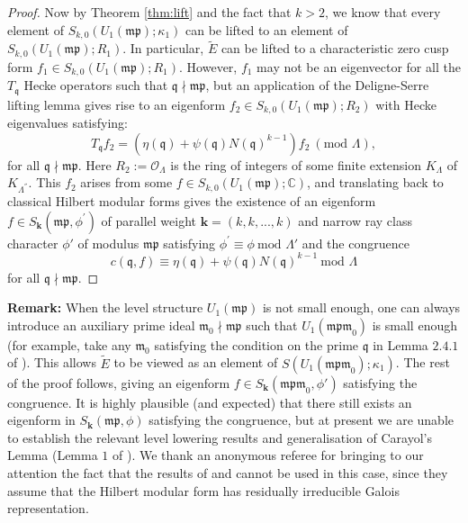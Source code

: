 \documentclass[a4paper,oneside]{amsart}
\theoremstyle{plain}
\theoremstyle{definition}
\begin{document}
\begin{proof}
Now by Theorem \ref{thm:lift} and the fact that $k>2$, we know that every element of $S_{k,0}(U_1(\mathfrak{mp});\kappa_1)$ can be lifted to an element of $S_{k,0}(U_1(\mathfrak{mp});R_1)$. In particular, $\tilde{E}$ can be lifted to a characteristic zero cusp form $f_1 \in S_{k,0}(U_1(\mathfrak{mp});R_1)$. However, $f_1$ may not be an eigenvector for all the $T_\mathfrak{q}$ Hecke operators such that $\mathfrak{q} \nmid \mathfrak{mp}$, but an application of the Deligne-Serre lifting lemma \cite[Lemma 6.11]{deligneserre} gives rise to an eigenform $f_2 \in S_{k,0}(U_1(\mathfrak{mp});R_2)$ with Hecke eigenvalues satisfying:
\begin{equation*}
    T_{\mathfrak{q}}f_2 = (\eta(\mathfrak{q}) + \psi(\mathfrak{q})N(\mathfrak{q})^{k-1})f_2 \ (\text{mod } \Lambda),
\end{equation*}
for all $\mathfrak{q} \nmid \mathfrak{mp}$. Here $R_2:= \mathcal{O}_{\Lambda}$ is the ring of integers of some finite extension $K_{\Lambda}$ of $K_{\Lambda^{''}}$. This $f_2$ arises from some $f \in S_{k,0}(U_1(\mathfrak{mp});\mathbb{C})$, and translating back to classical Hilbert modular forms gives the existence of an eigenform $f \in S_{\textbf{k}}(\mathfrak{mp}, \phi^\prime)$ of parallel weight $\textbf{k} = (k,k,...,k)$ and narrow ray class character $\phi'$ of modulus $\mathfrak{mp}$ satisfying $\phi^\prime \equiv \phi \ \text{mod } \Lambda'$ and the congruence
\begin{equation*}
    c(\mathfrak{q}, f) \equiv \eta(\mathfrak{q}) + \psi(\mathfrak{q})N(\mathfrak{q})^{k-1} \ \text{mod } \Lambda
\end{equation*}
for all $\mathfrak{q} \nmid \mathfrak{mp}$. 
\end{proof}

\noindent \textbf{Remark:} When the level structure $U_1(\mathfrak{mp})$ is not small enough, one can always introduce an auxiliary prime ideal $\mathfrak{m}_0\nmid \mathfrak{mp}$ such that $U_1(\mathfrak{mpm}_0)$ is small enough (for example, take any $\mathfrak{m}_0$ satisfying the condition on the prime $\mathfrak{q}$ in Lemma $2.4.1$ of \cite{diamondsasaki}). This allows $\tilde{E}$ to be viewed as an element of $S(U_1(\mathfrak{mpm}_0);\kappa_1)$. The rest of the proof follows, giving an eigenform $f\in S_{\textbf{k}}(\mathfrak{mpm}_0,\phi')$ satisfying the congruence. It is highly plausible (and expected) that there still exists an eigenform in $S_{\textbf{k}}(\mathfrak{mp},\phi)$ satisfying the congruence, but at present we are unable to establish the relevant level lowering results and generalisation of Carayol's Lemma (Lemma $1$ of \cite{carayol}). We thank an anonymous referee for bringing to our attention the fact that the results of \cite{jarvis} and \cite{jarvis2} cannot be used in this case, since they assume that the Hilbert modular form has residually irreducible Galois representation.
\end{document}
